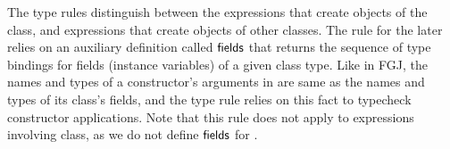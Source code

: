 

The type rules distinguish between the  expressions that create
objects of  the \RgnZ class, and  expressions that create
objects of other classes. The rule for the later relies on an
auxiliary definition called ${\sf fields}$ that returns the sequence of
type bindings for fields (instance variables) of a given class type.
Like in FGJ, the names and types of a constructor's arguments in \FB
are same as the names and types of its class's fields, and the type
rule relies on this fact to typecheck constructor applications. Note
that this rule does not apply to  expressions involving \RgnZ
class, as we do not define ${\sf fields}$ for \RgnZ. 

